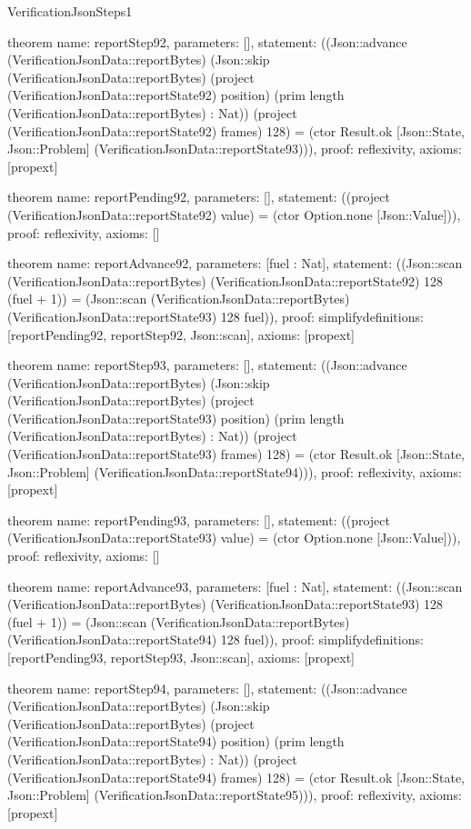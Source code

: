 \begin{lexlean}{VerificationJsonSteps1}
\begin{semanticmodule}
theorem{
  name: reportStep92,
  parameters: [],
  statement: ((Json::advance (VerificationJsonData::reportBytes) (Json::skip (VerificationJsonData::reportBytes) (project (VerificationJsonData::reportState92) position) (prim length (VerificationJsonData::reportBytes) : Nat)) (project (VerificationJsonData::reportState92) frames) 128) = (ctor Result.ok [Json::State, Json::Problem] (VerificationJsonData::reportState93))),
  proof: reflexivity{},
  axioms: [propext]
}

theorem{
  name: reportPending92,
  parameters: [],
  statement: ((project (VerificationJsonData::reportState92) value) = (ctor Option.none [Json::Value])),
  proof: reflexivity{},
  axioms: []
}

theorem{
  name: reportAdvance92,
  parameters: [fuel : Nat],
  statement: ((Json::scan (VerificationJsonData::reportBytes) (VerificationJsonData::reportState92) 128 (fuel + 1)) = (Json::scan (VerificationJsonData::reportBytes) (VerificationJsonData::reportState93) 128 fuel)),
  proof: simplify{definitions: [reportPending92, reportStep92, Json::scan]},
  axioms: [propext]
}

theorem{
  name: reportStep93,
  parameters: [],
  statement: ((Json::advance (VerificationJsonData::reportBytes) (Json::skip (VerificationJsonData::reportBytes) (project (VerificationJsonData::reportState93) position) (prim length (VerificationJsonData::reportBytes) : Nat)) (project (VerificationJsonData::reportState93) frames) 128) = (ctor Result.ok [Json::State, Json::Problem] (VerificationJsonData::reportState94))),
  proof: reflexivity{},
  axioms: [propext]
}

theorem{
  name: reportPending93,
  parameters: [],
  statement: ((project (VerificationJsonData::reportState93) value) = (ctor Option.none [Json::Value])),
  proof: reflexivity{},
  axioms: []
}

theorem{
  name: reportAdvance93,
  parameters: [fuel : Nat],
  statement: ((Json::scan (VerificationJsonData::reportBytes) (VerificationJsonData::reportState93) 128 (fuel + 1)) = (Json::scan (VerificationJsonData::reportBytes) (VerificationJsonData::reportState94) 128 fuel)),
  proof: simplify{definitions: [reportPending93, reportStep93, Json::scan]},
  axioms: [propext]
}

theorem{
  name: reportStep94,
  parameters: [],
  statement: ((Json::advance (VerificationJsonData::reportBytes) (Json::skip (VerificationJsonData::reportBytes) (project (VerificationJsonData::reportState94) position) (prim length (VerificationJsonData::reportBytes) : Nat)) (project (VerificationJsonData::reportState94) frames) 128) = (ctor Result.ok [Json::State, Json::Problem] (VerificationJsonData::reportState95))),
  proof: reflexivity{},
  axioms: [propext]
}


\end{semanticmodule}
\end{lexlean}
